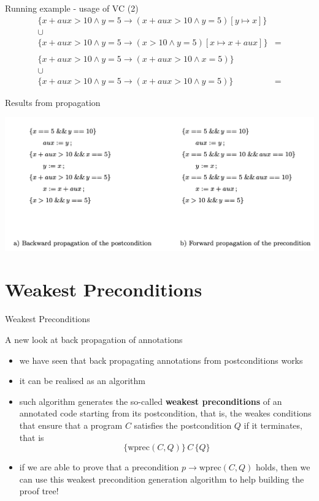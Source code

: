 \documentclass[aspectratio=169]{beamer}
\begin{document}
\begin{slide}{Running example - usage of VC (2)}
\footnotesize{
\begin{align*}
\{x + aux > 10 \land y = 5 \to (x + aux > 10 \land y = 5)[y \mapsto x]\} \\ \cup \\
\{x + aux > 10 \land y = 5 \to (x > 10 \land y = 5)[x \mapsto x + aux]\} & = \\ \\
\{x + aux > 10 \land y = 5 \to (x + aux > 10 \land x = 5)\} \\ \cup \\
\{x + aux > 10 \land y = 5 \to (x + aux > 10 \land y = 5)\} & =
\end{align*}  
}
\end{slide}

\begin{slide}{Results from propagation}
\begin{center}
\includegraphics[scale=0.5]{images/ex_code_prop}  
\end{center}
  
\end{slide}

\section*{Weakest Preconditions}

\begin{slide}{Weakest Preconditions}
  \begin{block}{A new look at back propagation of annotations}
  \begin{itemize}
  \item we have seen that back propagating annotations from postconditions works
  \item it can be realised as an algorithm
  \item such algorithm generates the so-called \textbf{weakest preconditions} of an annotated code starting from its postcondition, that is, the weakes conditions that ensure that a program $C$ satisfies the postcondition $Q$ if it terminates, that is $$\{\mathrm{wprec}(C,Q)\}\,C\,\{Q\}$$
  \item if we are able to prove that a precondition $p \to \mathrm{wprec}(C,Q)$ holds, then we can use this weakest precondition generation algorithm to help building the proof tree!
  \end{itemize}
  \end{block}
\end{slide}
\end{document}
